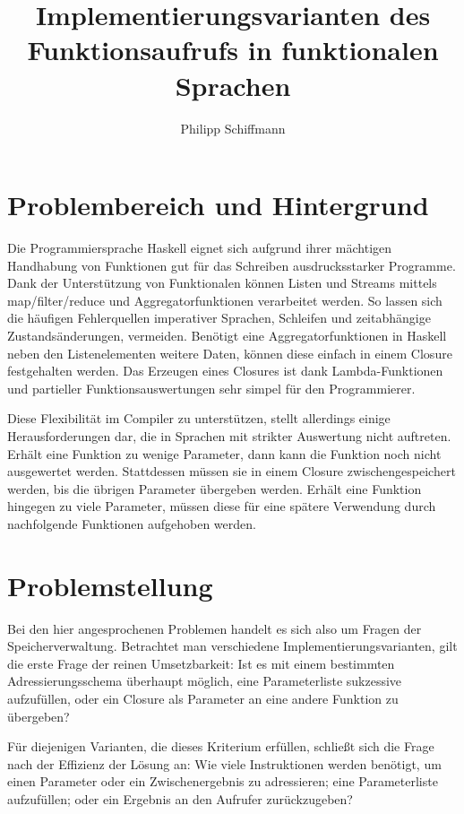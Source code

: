 \documentclass[a4paper,twoside,11pt]{article}
\title{Implementierungsvarianten des Funktionsaufrufs in funktionalen Sprachen}
\author{Philipp Schiffmann}
\begin{document}
\maketitle

\section{Problembereich und Hintergrund}

Die Programmiersprache Haskell eignet sich aufgrund ihrer mächtigen Handhabung von Funktionen gut für das Schreiben ausdrucksstarker Programme. Dank der Unterstützung von Funktionalen können Listen und Streams mittels map/filter/reduce und Aggregatorfunktionen verarbeitet werden. So lassen sich die häufigen Fehlerquellen imperativer Sprachen, Schleifen und zeitabhängige Zustandsänderungen, vermeiden. Benötigt eine Aggregatorfunktionen in Haskell neben den Listenelementen weitere Daten, können diese einfach in einem Closure festgehalten werden. Das Erzeugen eines Closures ist dank Lambda-Funktionen und partieller Funktionsauswertungen sehr simpel für den Programmierer.

Diese Flexibilität im Compiler zu unterstützen, stellt allerdings einige Herausforderungen dar, die in Sprachen mit strikter Auswertung nicht auftreten. Erhält eine Funktion zu wenige Parameter, dann kann die Funktion noch nicht ausgewertet werden. Stattdessen müssen sie in einem Closure zwischengespeichert werden, bis die übrigen Parameter übergeben werden. Erhält eine Funktion hingegen zu viele Parameter, müssen diese für eine spätere Verwendung durch nachfolgende Funktionen aufgehoben werden.

\section{Problemstellung}

Bei den hier angesprochenen Problemen handelt es sich also um Fragen der Speicherverwaltung. Betrachtet man verschiedene Implementierungsvarianten, gilt die erste Frage der reinen Umsetzbarkeit: Ist es mit einem bestimmten Adressierungsschema überhaupt möglich, eine Parameterliste sukzessive aufzufüllen, oder ein Closure als Parameter an eine andere Funktion zu übergeben?

Für diejenigen Varianten, die dieses Kriterium erfüllen, schließt sich die Frage nach der Effizienz der Lösung an: Wie viele Instruktionen werden benötigt, um einen Parameter oder ein Zwischenergebnis zu adressieren; eine Parameterliste aufzufüllen; oder ein Ergebnis an den Aufrufer zurückzugeben?
\end{document}
